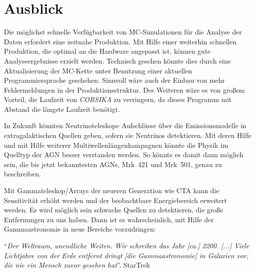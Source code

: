 \section{Ausblick}
Die möglichst schnelle Verfügbarkeit von MC-Simulationen für die Analyse der Daten erfordert eine zeitnahe Produktion.
Mit Hilfe einer weiterhin schnellen Produktion, die optimal an die Hardware angepasst ist, können gute Analyseergebnisse erzielt werden.
Technisch gesehen könnte dies durch eine Aktualisierung der MC-Kette unter Benutzung einer aktuellen Programmiersprache geschehen.
Sinnvoll wäre auch der Einbau von mehr Fehlermeldungen in der Produktionsstruktur.
Des Weiteren wäre es von großem Vorteil, die Laufzeit von \textit{CORSIKA} zu verringern, da dieses Programm mit Abstand die längste Laufzeit benötigt.

In Zukunft könnten Neutrinoteleskope Aufschlüsse über die Emissionsmodelle in extragalaktischen Quellen geben, sofern sie Neutrinos detektieren.
Mit deren Hilfe und mit Hilfe weiterer Multiwellenlängenkampagnen könnte die Physik im Quelltyp der AGN besser verstanden werden.
So könnte es damit dann möglich sein, die bis jetzt bekanntesten AGNs, Mrk~421 und Mrk~501, genau zu beschreiben.

Mit Gammateleskop\-/Arrays der neueren Generation wie CTA kann die Sensitivität erhöht werden und der beobachtbare Energiebereich erweitert werden.
Es wird möglich sein schwache Quellen zu detektieren, die große Entfernungen zu uns haben.
Dann ist es wahrscheinlich, mit Hilfe der Gammaastronomie in neue Bereiche vorzudringen: %

\enquote{\textit{Der Weltraum, unendliche Weiten. Wir schreiben das Jahr [ca.] 2200. [...] Viele Lichtjahre von der Erde entfernt dringt [die Gammaastronomie] in Galaxien vor, die nie ein Mensch zuvor gesehen hat}}. StarTrek